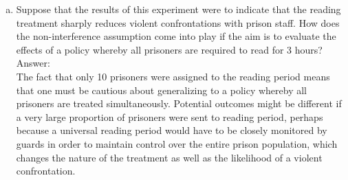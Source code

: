 \documentclass[11pt,notitlepage]{article}		%
\begin{document}
\begin{enumerate}[a)]
\item Suppose that the results of this experiment were to indicate that the reading treatment sharply reduces violent confrontations with prison staff.  How does the non-interference assumption come into play if the aim is to evaluate the effects of a policy whereby all prisoners are required to read for 3 hours?  \\
Answer:\\
The fact that only 10 prisoners were assigned to the reading period means that one must be cautious about generalizing to a policy whereby all prisoners are treated simultaneously. Potential outcomes might be different if a very large proportion of prisoners were sent to reading period, perhaps because a universal reading period would have to be closely monitored by guards in order to maintain control over the entire prison population, which changes the nature of the treatment as well as the likelihood of a violent confrontation.

\end{enumerate}
\end{document}
